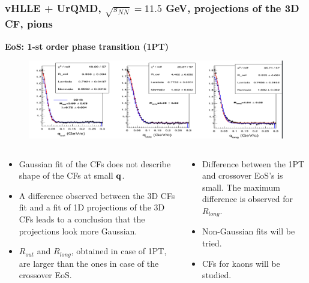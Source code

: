 \documentclass[dvipsnames] {beamer}
\begin{document}
\begin{frame}[shrink=33]
  \bf
  \frametitle{{\small \bf \centering vHLLE + UrQMD, $\sqrt{s_{NN}} = 11.5$ GeV, projections of the 3D CF, pions}}
  \begin{block}{\centering \bf EoS: 1-st order phase transition (1PT)}
    \begin{figure}[H]
       \includegraphics[width=1.\textwidth]{3DCF_projections_1pt.png}
     \end{figure}
  \end{block}
  \begin{columns}[c]
    \begin{block}{}
      \begin{itemize}
      \item Gaussian fit of the CFs does not describe shape of the CFs at small $\bf q$.
      \item A difference observed between the 3D CFs fit and a fit of 1D projections of the 3D CFs leads to a conclusion
        that the projections look more Gaussian. 
      \item $R_{out}$ and $R_{long}$, obtained in case of 1PT, are larger than the ones in case of the crossover EoS.
      \end{itemize}
    \end{block}
    \begin{block}{}
      \begin{itemize}
      \item Difference between the 1PT and crossover EoS's is small. The maximum difference is observed for $R_{long}$.
      \item {\color{red} Non-Gaussian fits will be tried.}
      \item {\color{red} CFs for kaons will  be studied.}
      \end{itemize}
    \end{block}
  \end{columns}
\end{frame}




  
\end{document}
